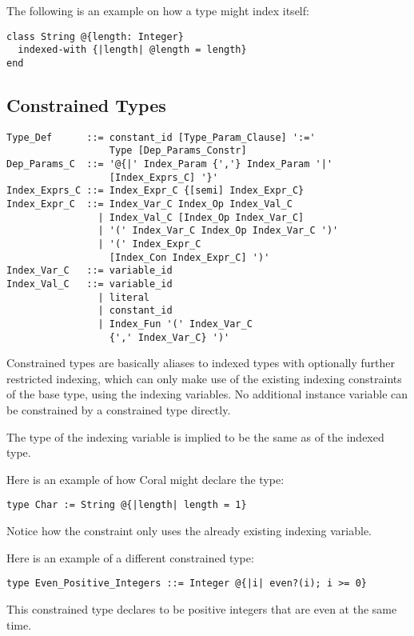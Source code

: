 \example The following is an example on how a  type might index itself: 
\begin{lstlisting}
class String @{length: Integer}
  indexed-with {|length| @length = length}
end
\end{lstlisting}

\subsection{Constrained Types}
\label{sec:constrained-types}

\syntax\begin{lstlisting}
Type_Def      ::= constant_id [Type_Param_Clause] ':=' 
                  Type [Dep_Params_Constr]
Dep_Params_C  ::= '@{|' Index_Param {','} Index_Param '|'
                  [Index_Exprs_C] '}'
Index_Exprs_C ::= Index_Expr_C {[semi] Index_Expr_C}
Index_Expr_C  ::= Index_Var_C Index_Op Index_Val_C
                | Index_Val_C [Index_Op Index_Var_C]
                | '(' Index_Var_C Index_Op Index_Var_C ')'
                | '(' Index_Expr_C 
                  [Index_Con Index_Expr_C] ')'
Index_Var_C   ::= variable_id
Index_Val_C   ::= variable_id
                | literal
                | constant_id
                | Index_Fun '(' Index_Var_C 
                  {',' Index_Var_C} ')'
\end{lstlisting}

Constrained types are basically aliases to indexed types with optionally further restricted indexing, which can only make use of the existing indexing constraints of the base type, using the indexing variables. No additional instance variable can be constrained by a constrained type directly. 

The type of the indexing variable is implied to be the same as of the indexed type. 

\example Here is an example of how Coral might declare the  type:
\begin{lstlisting}
type Char := String @{|length| length = 1}
\end{lstlisting}
Notice how the constraint only uses the already existing indexing variable. 

\example Here is an example of a different constrained type: 
\begin{lstlisting}
type Even_Positive_Integers ::= Integer @{|i| even?(i); i >= 0}
\end{lstlisting}
This constrained type declares  to be positive integers that are even at the same time. 

